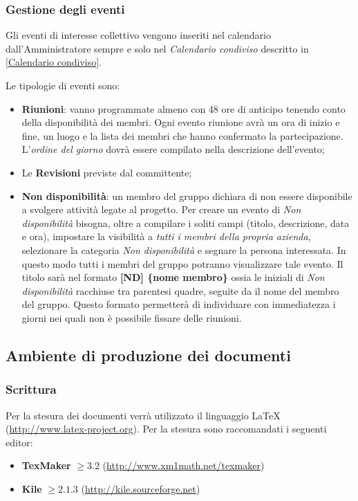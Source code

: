 		\subsubsection{Gestione degli eventi}
		
		Gli eventi di interesse collettivo vengono inseriti nel calendario dall'Amministratore sempre e solo nel \emph{Calendario condiviso} descritto in \ref{Calendario condiviso}.
		
		Le tipologie di eventi sono:
		\begin{itemize}
	  		\item \textbf{Riunioni}: vanno programmate almeno con 48 ore di anticipo tenendo conto della disponibilità dei membri. Ogni evento riunione avrà un ora di inizio e fine, un luogo e la lista dei membri che hanno confermato la partecipazione. L'\emph{ordine del giorno} dovrà essere compilato nella descrizione dell'evento;
	  		\item Le \textbf{Revisioni} previste dal committente;
	  		\item \textbf{Non disponibilità}: un membro del gruppo dichiara di non essere disponibile a svolgere attività legate al progetto. Per creare un evento di \emph{Non disponibilità} bisogna, oltre a compilare i soliti campi (titolo, descrizione, data e ora), impostare la visibilità a \emph{tutti i membri della propria azienda}, selezionare la categoria \emph{Non disponibilità} e segnare la persona interessata. In questo modo tutti i membri del gruppo \GroupName{} potranno visualizzare tale evento. 
	  		Il titolo sarà nel formato \textbf{[ND] \{nome membro\}} ossia le iniziali di \emph{Non disponibilità} racchiuse tra parentesi quadre, seguite da il nome del membro del gruppo. Questo formato permetterà di individuare con immediatezza i giorni nei quali non è possibile fissare delle riunioni.
		\end{itemize}
	
	\subsection{Ambiente di produzione dei documenti}
	
		\subsubsection{Scrittura}
		
		Per la stesura dei documenti verrà utilizzato il linguaggio \LaTeX{} (\url{http://www.latex-project.org}).
		Per la stesura sono raccomandati i seguenti editor:
		\begin{itemize}
		 \item \textbf{TexMaker} $\geq 3.2$ (\url{http://www.xm1math.net/texmaker})
		 \item \textbf{Kile} $\geq 2.1.3$ (\url{http://kile.sourceforge.net})
		\end{itemize}
		
